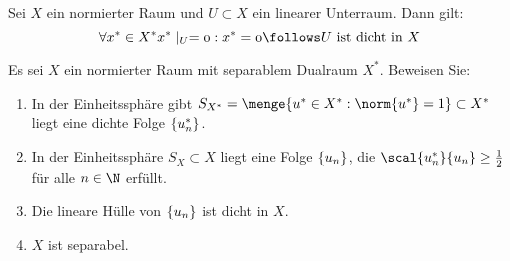 \begin{exercisePage}
	
	\setcounter{taskcount}{32}
	
	\begin{lemma} \label{lemma: 33}
		Sei $X$ ein normierter Raum und $U \subset X$ ein linearer Unterraum. Dann gilt:
		\begin{equation*}
		\forall x^\ast \in X^\ast \mit x^\ast\mid_U = 0: x^\ast = 0 \follows U \text{ ist dicht in } X 
		\end{equation*}
	\end{lemma}
	\begin{exercise}
		Es sei $X$ ein normierter Raum mit separablem Dualraum $X^\ast$. Beweisen Sie:
		\begin{enumerate}[nolistsep]
			\item In der Einheitssphäre gibt $S_{X^\ast} = \menge{u^\ast \in X^\ast : \norm{u^\ast} = 1} \subset X^\ast$ liegt eine dichte Folge $\left\{ u_n^\ast \right\}_{}$.
			\item In der Einheitssphäre $S_X \subset X$ liegt eine Folge $\left\{ u_n \right\}_{}$, die $\scal{u_n^\ast}{u_n} \ge \frac{1}{2}$ für alle $n \in \N$ erfüllt.
			\item Die lineare Hülle von $\left\{ u_n \right\}_{}$ ist dicht in $X$.
			\item $X$ ist separabel.
		\end{enumerate}
	\end{exercise}
	

\end{exercisePage}
